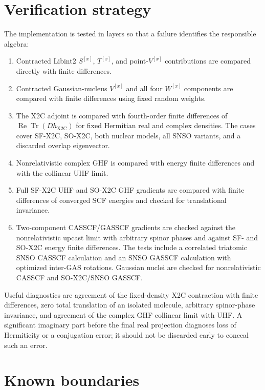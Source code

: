 \documentclass[aip,jcp,preprint]{revtex4-1}
\newcommand{\Tr}{\operatorname{Tr}}
\newcommand{\RePart}{\operatorname{Re}}
\newcommand{\xcoord}{{[x]}}
\begin{document}
\section{Verification strategy}

The implementation is tested in layers so that a failure identifies the
responsible algebra:
\begin{enumerate}
\item Contracted Libint2 $S^\xcoord$, $T^\xcoord$, and point-$V^\xcoord$
contributions are compared directly with finite differences.
\item Contracted Gaussian-nucleus $V^\xcoord$ and all four $W^\xcoord$
components are compared with finite differences using fixed random weights.
\item The X2C adjoint is compared with fourth-order finite differences of
$\RePart\Tr(Dh_\mathrm{X2C})$ for fixed Hermitian real and complex densities.
The cases cover SF-X2C, SO-X2C, both nuclear models, all SNSO variants, and a
discarded overlap eigenvector.
\item Nonrelativistic complex GHF is compared with energy finite differences
and with the collinear UHF limit.
\item Full SF-X2C UHF and SO-X2C GHF gradients are compared with finite
differences of converged SCF energies and checked for translational invariance.
\item Two-component CASSCF/GASSCF gradients are checked against the
nonrelativistic upcast limit with arbitrary spinor phases and against SF- and
SO-X2C energy finite differences.  The tests include a correlated triatomic
SNSO CASSCF calculation and an SNSO GASSCF calculation with optimized inter-GAS
rotations.  Gaussian nuclei are checked for nonrelativistic CASSCF and
SO-X2C/SNSO GASSCF.
\end{enumerate}

Useful diagnostics are agreement of the fixed-density X2C contraction with
finite differences, zero total translation of an isolated molecule, arbitrary
spinor-phase invariance, and agreement of the complex GHF collinear limit with
UHF.  A significant imaginary part before the final real projection diagnoses
loss of Hermiticity or a conjugation error; it should not be discarded early to
conceal such an error.

\section{Known boundaries}
\end{document}
